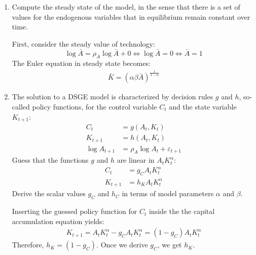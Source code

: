\documentclass[a4paper]{scrartcl}
\begin{document}
\begin{enumerate}
\begin{solution}
		(I) and (II) yields
		\begin{align*}
		C_t^{-1} = \alpha\beta E_t C_{t+1}^{-1} A_{t+1} K_{t+1}^{\alpha-1}
		\end{align*}
	\end{solution}
	\item Compute the steady state of the model, in the sense that there is a set of values for the endogenous variables that in equilibrium remain constant over time.
	\begin{solution}
		First, consider the steady value of technology: 
		$$\log\bar{A}=\rho_A \log\bar{A} + 0 \Leftrightarrow \log\bar{A} = 0 \Leftrightarrow \bar{A} = 1$$ 
		The Euler equation in steady state becomes:
		\begin{align*}
		\bar{K} = (\alpha \beta \bar{A})^{\frac{1}{1-\alpha}}
		\end{align*}
	\end{solution}
	\item The solution to a DSGE model is characterized by decision rules $g$ and $h$, so-called policy functions, for the control variable $C_t$ and the state variable $K_{t+1}$:
	\begin{align*}
		C_{t} &= g(A_t,K_t)\\
		K_{t+1} & = h(A_t,K_t)\\
		\log{A_{t+1}} &= \rho_A \log{A_{t}} + \varepsilon_{t+1}
	\end{align*}
	Guess that the functions $g$ and $h$ are linear in $A_t K_t^\alpha$:
	\begin{align*}
	C_{t} &= g_C A_t K_t^\alpha\\
	K_{t+1} & = h_K A_t K_t^\alpha
	\end{align*}
	Derive the scalar values $g_C$ and $h_C$ in terms of model parameters $\alpha$ and $\beta$.
	\begin{solution}	
	Inserting the guessed policy function for $C_t$ inside the the capital accumulation equation yields:
	\begin{align*}
	K_{t+1} = A_{t}K_{t}^\alpha - g_C A_t K_t^\alpha = (1-g_C) A_t K_t^\alpha
	\end{align*}
	Therefore, $h_K=(1-g_C)$. Once we derive $g_C$, we get  $h_K$.
	

\end{solution}
\end{enumerate}
\end{document}
